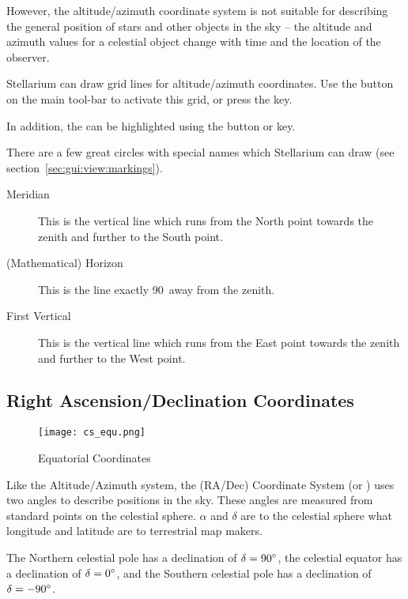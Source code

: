 However, the altitude/azimuth coordinate system is not suitable for
describing the general position of stars and other objects in the sky --
the altitude and azimuth values for a celestial object change with
time and the location of the observer.

Stellarium can draw grid lines for altitude/azimuth coordinates. Use the 
button on the main tool-bar to activate this grid, or press the  key.

In addition, the  can be highlighted using
the  button or  key.

There are a few great circles with special names which Stellarium can
draw (see section~\ref{sec:gui:view:markings}).
\begin{description}
\item[Meridian] This is the vertical line which runs from the North
  point towards the zenith and further to the South point.
\item[(Mathematical) Horizon] This is the line exactly 90\degree\ away
  from the zenith.
\item[First Vertical] This is the vertical line which runs from the East
  point towards the zenith and further to the West point.
\end{description}

\subsection{Right Ascension/Declination Coordinates}
\label{sec:Concepts:Equatorial}

\begin{figure}[ht]
\centering\texttt{[image: cs\_equ.png]}
\caption{Equatorial Coordinates}
\label{fig:EquatorialCoordinates}
\end{figure}

Like the Altitude/Azimuth system, the 
(RA/Dec) Coordinate System (or ) uses two angles to describe positions in the
sky. These angles are measured from standard points on the celestial
sphere.  $\alpha$ and  $\delta$ are to the celestial sphere what
longitude and latitude are to terrestrial map makers.

The Northern celestial pole has a declination of $\delta=90\degree$, the celestial
equator has a declination of $\delta=0\degree$, and the Southern celestial pole has a declination of $\delta=-90\degree$.

